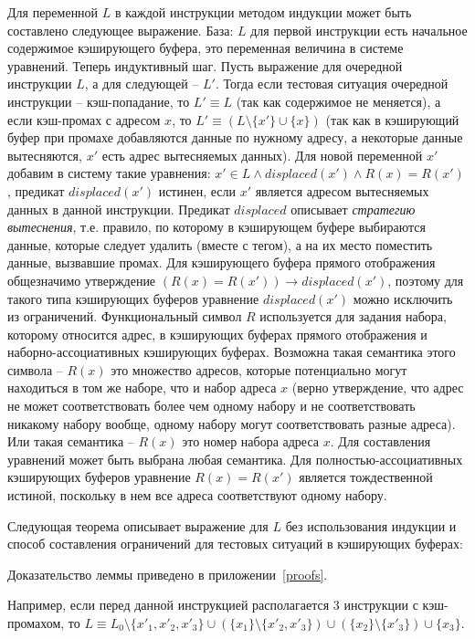 Для переменной $L$ в каждой инструкции методом индукции может быть
составлено следующее выражение. База: $L$ для первой инструкции есть
начальное содержимое кэширующего буфера, это переменная величина в
системе уравнений. Теперь индуктивный шаг. Пусть выражение для
очередной инструкции $L$, а для следующей -- $L'$. Тогда если
тестовая ситуация очередной инструкции -- кэш-попадание, то $L'
\equiv L$ (так как содержимое не меняется), а если кэш-промах с
адресом $x$, то $L' \equiv (L \setminus \{x'\} \cup \{x\})$ (так как
в кэширующий буфер при промахе добавляются данные по нужному адресу,
а некоторые данные вытесняются, $x'$ есть адрес вытесняемых данных).
Для новой переменной $x'$ добавим в систему такие уравнения: $x' \in
L \wedge displaced(x') \wedge R(x) = R(x')$, предикат
$displaced(x')$ истинен, если $x'$ является адресом вытесняемых
данных в данной инструкции. Предикат $displaced$ описывает
\emph{стратегию вытеснения}, т.е. правило, по которому в кэширующем
буфере выбираются данные, которые следует удалить (вместе с тегом),
а на их место поместить данные, вызвавшие промах. Для кэширующего
буфера прямого отображения общезначимо утверждение $(R(x) = R(x'))
\rightarrow displaced(x')$, поэтому для такого типа кэширующих
буферов уравнение $displaced(x')$ можно исключить из ограничений.
Функциональный символ $R$ используется для задания набора, которому
относится адрес, в кэширующих буферах прямого отображения и
наборно-ассоциативных кэширующих буферах. Возможна такая семантика
этого символа -- $R(x)$ это множество адресов, которые потенциально
могут находиться в том же наборе, что и набор адреса $x$ (верно
утверждение, что адрес не может соответствовать более чем одному
набору и не соответствовать никакому набору вообще, одному набору
могут соответствовать разные адреса). Или такая семантика -- $R(x)$
это номер набора адреса $x$. Для составления уравнений может быть
выбрана любая семантика. Для полностью-ассоциативных кэширующих
буферов уравнение $R(x) = R(x')$ является тождественной истиной,
поскольку в нем все адреса соответствуют одному набору.

Следующая теорема описывает выражение для $L$ без использования
индукции и способ составления ограничений для тестовых ситуаций в
кэширующих буферах:
\begin{lemma}\label{L_current} \LcurrentBody
\end{lemma}
Доказательство леммы приведено в приложении~\ref{proofs}.

Например, если перед данной инструкцией располагается 3 инструкции с
кэш-промахом, то $L \equiv L_0 \setminus \{x'_1, x'_2, x'_3\} \cup
(\{x_1\} \setminus \{x'_2, x'_3\}) \cup (\{x_2\} \setminus \{x'_3\})
\cup \{x_3\}$.

